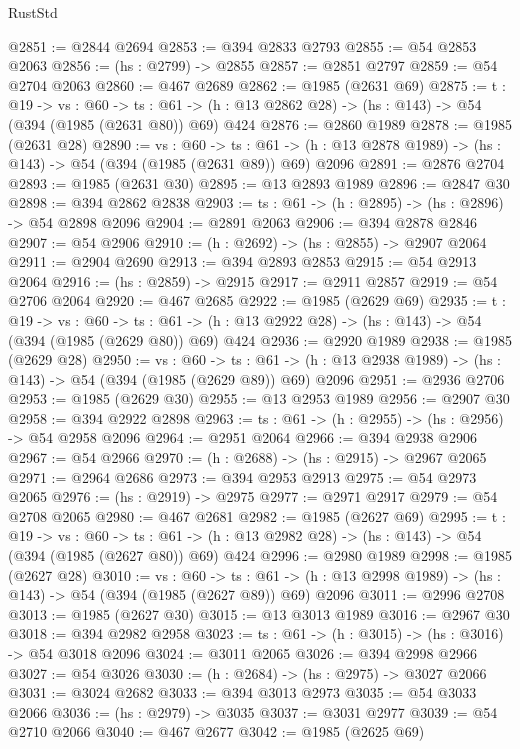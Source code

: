 \begin{lexlean}{RustStd}
\begin{coremodule}
{\begin{coremodule}
{{{{{{{{@2851 := @2844 @2694
@2853 := @394 @2833 @2793
@2855 := @54 @2853 @2063
@2856 := (hs : @2799) -> @2855
@2857 := @2851 @2797
@2859 := @54 @2704 @2063
@2860 := @467 @2689
@2862 := @1985 (@2631 @69)
@2875 := {t : @19} ->
  {vs : @60} ->
  {ts : @61} -> (h : @13 @2862 @28) -> (hs : @143) -> @54 (@394 (@1985 (@2631 @80)) @69) @424
@2876 := @2860 @1989
@2878 := @1985 (@2631 @28)
@2890 := {vs : @60} ->
  {ts : @61} -> (h : @13 @2878 @1989) -> (hs : @143) -> @54 (@394 (@1985 (@2631 @89)) @69) @2096
@2891 := @2876 @2704
@2893 := @1985 (@2631 @30)
@2895 := @13 @2893 @1989
@2896 := @2847 @30
@2898 := @394 @2862 @2838
@2903 := {ts : @61} -> (h : @2895) -> (hs : @2896) -> @54 @2898 @2096
@2904 := @2891 @2063
@2906 := @394 @2878 @2846
@2907 := @54 @2906
@2910 := (h : @2692) -> (hs : @2855) -> @2907 @2064
@2911 := @2904 @2690
@2913 := @394 @2893 @2853
@2915 := @54 @2913 @2064
@2916 := (hs : @2859) -> @2915
@2917 := @2911 @2857
@2919 := @54 @2706 @2064
@2920 := @467 @2685
@2922 := @1985 (@2629 @69)
@2935 := {t : @19} ->
  {vs : @60} ->
  {ts : @61} -> (h : @13 @2922 @28) -> (hs : @143) -> @54 (@394 (@1985 (@2629 @80)) @69) @424
@2936 := @2920 @1989
@2938 := @1985 (@2629 @28)
@2950 := {vs : @60} ->
  {ts : @61} -> (h : @13 @2938 @1989) -> (hs : @143) -> @54 (@394 (@1985 (@2629 @89)) @69) @2096
@2951 := @2936 @2706
@2953 := @1985 (@2629 @30)
@2955 := @13 @2953 @1989
@2956 := @2907 @30
@2958 := @394 @2922 @2898
@2963 := {ts : @61} -> (h : @2955) -> (hs : @2956) -> @54 @2958 @2096
@2964 := @2951 @2064
@2966 := @394 @2938 @2906
@2967 := @54 @2966
@2970 := (h : @2688) -> (hs : @2915) -> @2967 @2065
@2971 := @2964 @2686
@2973 := @394 @2953 @2913
@2975 := @54 @2973 @2065
@2976 := (hs : @2919) -> @2975
@2977 := @2971 @2917
@2979 := @54 @2708 @2065
@2980 := @467 @2681
@2982 := @1985 (@2627 @69)
@2995 := {t : @19} ->
  {vs : @60} ->
  {ts : @61} -> (h : @13 @2982 @28) -> (hs : @143) -> @54 (@394 (@1985 (@2627 @80)) @69) @424
@2996 := @2980 @1989
@2998 := @1985 (@2627 @28)
@3010 := {vs : @60} ->
  {ts : @61} -> (h : @13 @2998 @1989) -> (hs : @143) -> @54 (@394 (@1985 (@2627 @89)) @69) @2096
@3011 := @2996 @2708
@3013 := @1985 (@2627 @30)
@3015 := @13 @3013 @1989
@3016 := @2967 @30
@3018 := @394 @2982 @2958
@3023 := {ts : @61} -> (h : @3015) -> (hs : @3016) -> @54 @3018 @2096
@3024 := @3011 @2065
@3026 := @394 @2998 @2966
@3027 := @54 @3026
@3030 := (h : @2684) -> (hs : @2975) -> @3027 @2066
@3031 := @3024 @2682
@3033 := @394 @3013 @2973
@3035 := @54 @3033 @2066
@3036 := (hs : @2979) -> @3035
@3037 := @3031 @2977
@3039 := @54 @2710 @2066
@3040 := @467 @2677
@3042 := @1985 (@2625 @69)
}}}}}}}}
\end{coremodule}}
\end{coremodule}
\end{lexlean}
